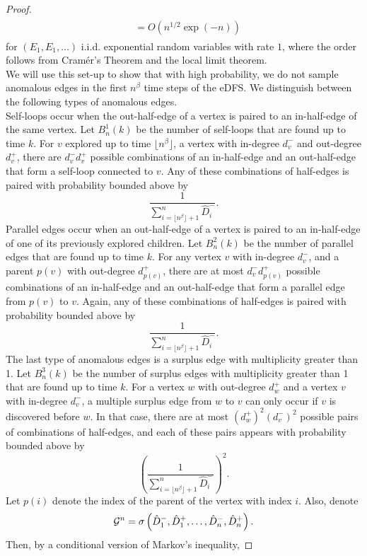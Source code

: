 \begin{proof}
\begin{align}
\begin{split}
&=O(n^{1/2}\exp(-n))\end{split}\end{align}
for $(E_1,E_1,\dots)$ i.i.d. exponential random variables with rate $1$, where the order follows from Cramér's Theorem and the local limit theorem. \\
We will use this set-up to show that with high probability, we do not sample anomalous edges in the first $n^\beta$ time steps of the eDFS. We distinguish between the following types of anomalous edges.\\
Self-loops occur when the out-half-edge of a vertex is paired to an in-half-edge of the same vertex.  Let $B^1_n(k)$ be the number of self-loops that are found up to time $k$. For $v$ explored up to time $\lfloor n^\beta\rfloor$, a vertex with in-degree $d^-_v$ and out-degree $d^+_v$, there are $d^-_v d^+_v$ possible combinations of an in-half-edge and an out-half-edge that form a self-loop connected to $v$. Any of these combinations of half-edges is paired with probability bounded above by 
$$\frac{1}{\sum_{i=\lfloor n^\beta \rfloor+1}^n\hat{D}^-_i}.$$
Parallel edges occur when an out-half-edge of a vertex is paired to an in-half-edge of one of its previously explored children. Let $B^2_n(k)$ be the number of parallel edges that are found up to time $k$. For any vertex $v$ with in-degree $d^-_v$, and a parent $p(v)$ with out-degree $d^+_{p(v)}$, there are at most $d^-_v d^+_{p(v)}$ possible combinations of an in-half-edge and an out-half-edge that form a parallel edge from $p(v)$ to $v$. Again, any of these combinations of half-edges is paired with probability bounded above by 
$$\frac{1}{\sum_{i=\lfloor n^\beta \rfloor+1}^n \hat{D}^-_i}.$$
The last type of anomalous edges is a surplus edge with multiplicity greater than 1. Let $B^3_n(k)$ be the number of surplus edges with multiplicity greater than 1 that are found up to time $k$. For a vertex $w$ with out-degree $d^+_w$ and a vertex $v$ with in-degree $d^-_v$, a multiple surplus edge from $w$ to $v$ can only occur if $v$ is discovered before $w$. In that case, there are at most $(d^+_w)^2(d^-_v)^2$ possible pairs of combinations of half-edges, and each of these pairs appears with probability bounded above by
$$\left(\frac{1}{\sum_{i=\lfloor n^\beta \rfloor+1}^n \hat{D}^-_i}\right)^2.$$
Let $p(i)$ denote the index of the parent of the vertex with index $i$. Also, denote $${\mathcal G}^n=\sigma\left(\hat{D}^-_1,\hat{D}^+_1,\dots,\hat{D}^-_n,\hat{D}^+_n \right).$$ Then, by a conditional version of Markov's inequality, 


\end{proof}
